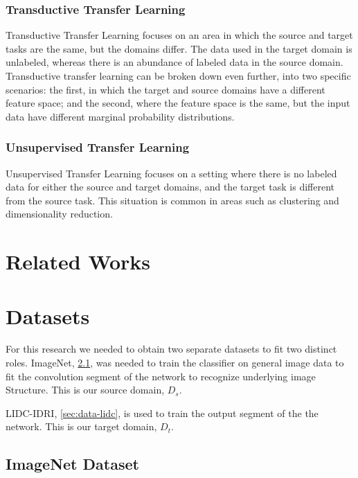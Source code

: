 \documentclass[10pt,twocolumn,letterpaper]{article}
\begin{document}
      \subsubsection{Transductive Transfer Learning} \label{sec:intro-types-transductive}
         Transductive Transfer Learning focuses on an area in which the source and target tasks are the same, but the domains
         differ. The data used in the target domain is unlabeled, whereas there is an abundance of labeled data in the source
         domain. Transductive transfer learning can be broken down even further, into two specific scenarios: the first, in
         which the target and source domains have a different feature space; and the second, where the feature space is the
         same, but the input data have different marginal probability distributions.

      \subsubsection{Unsupervised Transfer Learning} \label{sec:intro-types-unsupervised}
         Unsupervised Transfer Learning focuses on a setting where there is no labeled data for either the source and target
         domains, and the target task is different from the source task. This situation is common in areas such as clustering
         and dimensionality reduction.


\section{Related Works} \label{sec:works}

\section{Datasets} \label{sec:data}
   For this research we needed to obtain two separate datasets to fit two
   distinct roles. ImageNet, \ref{sec:data-imagenet}, was needed to train
   the classifier on general image data to fit the convolution segment of
   the network to recognize underlying image Structure. This is our source
   domain, $D_s$.

   LIDC-IDRI, \ref{sec:data-lidc}, is used to train the output segment of the
   the network. This is our target domain, $D_t$.

   \subsection{ImageNet Dataset} \label{sec:data-imagenet}
\end{document}
